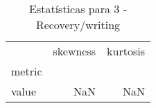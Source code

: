 \begin{table}[htbp]
\caption{Estatísticas para 3 - Recovery/writing}
\label{tab:3_-_recovery_writing_skewkurt}
\begin{tabular}{lrr}
\toprule
 & skewness & kurtosis \\
metric &  &  \\
\midrule
value & NaN & NaN \\
\bottomrule
\end{tabular}
\end{table}
